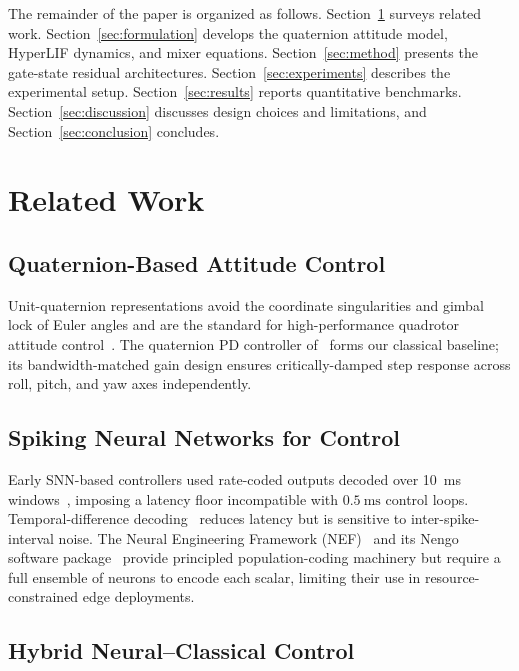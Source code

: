 \documentclass[conference]{IEEEtran}
\begin{document}
The remainder of the paper is organized as follows.
Section~\ref{sec:related} surveys related work.
Section~\ref{sec:formulation} develops the quaternion attitude model, HyperLIF
dynamics, and mixer equations.
Section~\ref{sec:method} presents the gate-state residual architectures.
Section~\ref{sec:experiments} describes the experimental setup.
Section~\ref{sec:results} reports quantitative benchmarks.
Section~\ref{sec:discussion} discusses design choices and limitations, and
Section~\ref{sec:conclusion} concludes.

\section{Related Work}
\label{sec:related}

\subsection{Quaternion-Based Attitude Control}

Unit-quaternion representations avoid the coordinate singularities and gimbal
lock of Euler angles and are the standard for high-performance quadrotor
attitude control~\cite{diebel2006quaternion}.
The quaternion PD controller of~\cite{mclachlan2021quaternion} forms our
classical baseline; its bandwidth-matched gain design ensures critically-damped
step response across roll, pitch, and yaw axes independently.

\subsection{Spiking Neural Networks for Control}

Early SNN-based controllers used rate-coded outputs decoded over
\SI{10}{\milli\second} windows~\cite{eliasmith2004neuraleng}, imposing
a latency floor incompatible with $\SI{0.5}{\milli\second}$ control loops.
Temporal-difference decoding~\cite{bohte2002error} reduces latency but is
sensitive to inter-spike-interval noise.
The Neural Engineering Framework (NEF)~\cite{eliasmith2004neuraleng} and its
Nengo software package~\cite{bekolay2014nengo} provide principled
population-coding machinery but require a full ensemble of neurons to encode
each scalar, limiting their use in resource-constrained edge deployments.

\subsection{Hybrid Neural–Classical Control}
\end{document}
